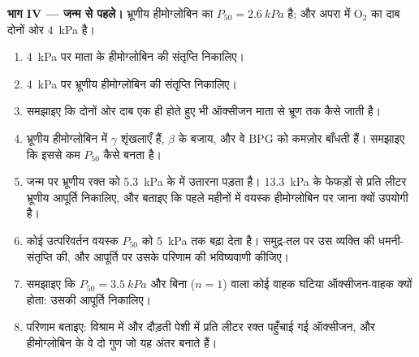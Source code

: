 \begin{problem}
\medskip
\noindent\textbf{भाग IV --- जन्म से पहले।}
भ्रूणीय हीमोग्लोबिन का $P_{50} = \qty{2.6}{kPa}$ है; और अपरा में
$\mathrm{O_2}$ का दाब दोनों ओर \qty{4}{kPa} है।
\begin{enumerate}[resume]
  \item \qty{4}{kPa} पर माता के हीमोग्लोबिन की संतृप्ति निकालिए।
  \item \qty{4}{kPa} पर भ्रूणीय हीमोग्लोबिन की संतृप्ति निकालिए।
  \item समझाइए कि दोनों ओर दाब एक ही होते हुए भी ऑक्सीजन माता से भ्रूण
        तक कैसे जाती है।
  \item भ्रूणीय हीमोग्लोबिन में $\gamma$ शृंखलाएँ हैं, $\beta$ के
        बजाय, और वे BPG को कमज़ोर बाँधती हैं। समझाइए कि इससे कम $P_{50}$ कैसे बनता
        है।
  \item जन्म पर भ्रूणीय रक्त को \qty{5.3}{kPa} के  में उतारना
        पड़ता है। \qty{13.3}{kPa} के फेफड़ों से प्रति लीटर भ्रूणीय
        आपूर्ति निकालिए, और बताइए कि पहले महीनों में वयस्क
        हीमोग्लोबिन पर जाना क्यों उपयोगी है।
  \item कोई उत्परिवर्तन वयस्क $P_{50}$ को \qty{5}{kPa} तक बढ़ा देता है।
        समुद्र-तल पर उस व्यक्ति की धमनी-संतृप्ति की, और आपूर्ति पर उसके
        परिणाम की भविष्यवाणी कीजिए।
  \item समझाइए कि $P_{50} = \qty{3.5}{kPa}$ और बिना 
        ($n = 1$) वाला कोई वाहक घटिया ऑक्सीजन-वाहक क्यों होता: उसकी
        आपूर्ति निकालिए।
  \item परिणाम बताइए: विश्राम में और दौड़ती पेशी में प्रति लीटर रक्त
        पहुँचाई गई ऑक्सीजन, और हीमोग्लोबिन के वे दो गुण जो यह अंतर
        बनाते हैं।
\end{enumerate}
\end{problem}
